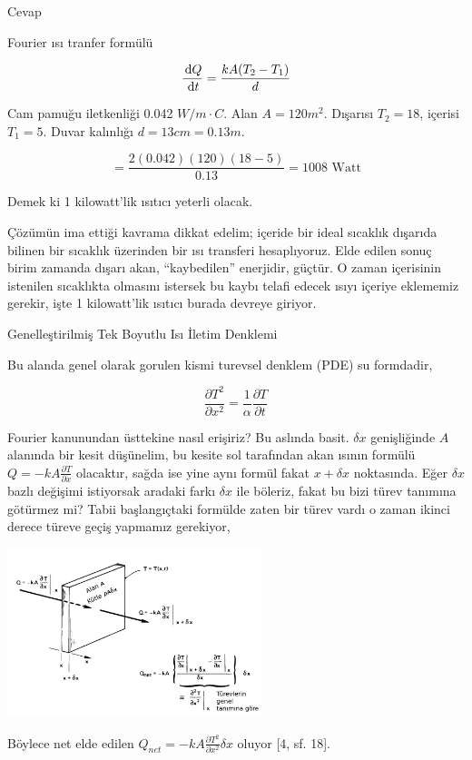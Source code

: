 \documentclass[12pt,fleqn]{article}\usepackage{../../common}
\begin{document}
Cevap

Fourier ısı tranfer formülü

$$
\frac{\,\mathrm{d} Q}{\,\mathrm{d} t} = \frac{k A (T_2 - T_1)}{d}
$$

Cam pamuğu iletkenliği 0.042 $W / m \cdot C$. Alan $A = 120 m^2$. Dışarısı $T_2
= 18$, içerisi $T_1 = 5$. Duvar kalınlığı $d = 13 cm = 0.13 m$.

$$
= \frac{2 (0.042) (120) (18-5)}{0.13} = 1008 \textrm{ Watt}
$$

Demek ki 1 kilowatt'lik ısıtıcı yeterli olacak.

Çözümün ima ettiği kavrama dikkat edelim; içeride bir ideal sıcaklık dışarıda
bilinen bir sıcaklık üzerinden bir ısı transferi hesaplıyoruz. Elde edilen sonuç
birim zamanda dışarı akan, ``kaybedilen'' enerjidir, güçtür. O zaman içerisinin
istenilen sıcaklıkta olmasını istersek bu kaybı telafi edecek ısıyı içeriye
eklememiz gerekir, işte 1 kilowatt'lik ısıtıcı burada devreye giriyor.

Genelleştirilmiş Tek Boyutlu Isı İletim Denklemi

Bu alanda genel olarak gorulen kismi turevsel denklem (PDE) su formdadir,

$$
\frac{\partial T^2}{\partial x^2} = \frac{1}{\alpha} \frac{\partial T}{\partial t}
$$

Fourier kanunundan üsttekine nasıl erişiriz? Bu aslında basit. $\delta x$
genişliğinde $A$ alanında bir kesit düşünelim, bu kesite sol tarafından akan
ısının formülü $Q = -kA \frac{\partial T}{\partial x}$ olacaktır, sağda ise yine
aynı formül fakat $x + \delta x$ noktasında. Eğer $\delta x$ bazlı değişimi
istiyorsak aradaki farkı $\delta x$ ile böleriz, fakat bu bizi türev tanımına
götürmez mi? Tabii başlangıçtaki formülde zaten bir türev vardı o zaman ikinci
derece türeve geçiş yapmamız gerekiyor,

\includegraphics[width=20em]{heat_3.png}

Böylece net elde edilen $Q_{net} = -k A \frac{\partial T^2}{\partial x^2} \delta x$
oluyor [4, sf. 18].
\end{document}
